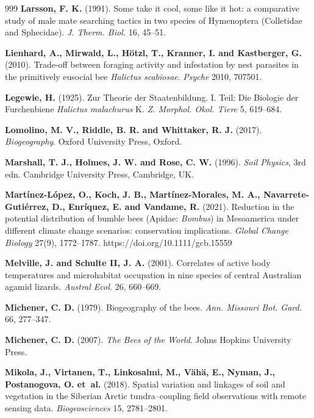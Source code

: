 \documentclass[11pt,a4paper]{article}
\begin{document}
\begin{thebibliography}{999}
\textbf{Larsson, F. K.} (1991).
Some take it cool, some like it hot: a comparative study of male mate searching tactics in two species of Hymenoptera (Colletidae and Sphecidae).
\textit{J. Therm. Biol.} 16, 45--51.

\textbf{Lienhard, A., Mirwald, L., H\"otzl, T., Kranner, I. and Kastberger, G.} (2010). Trade-off between foraging activity and infestation by nest parasites in the primitively eusocial bee \textit{Halictus scabiosae}. \textit{Psyche} 2010, 707501.

\textbf{Legewie, H.} (1925). Zur Theorie der Staatenbildung. I. Teil: Die Biologie der Furchenbiene \textit{Halictus malachurus} K. \textit{Z. Morphol. Okol. Tiere} 5, 619--684.

\textbf{Lomolino, M. V., Riddle, B. R. and Whittaker, R. J.} (2017).
\textit{Biogeography}. Oxford University Press, Oxford.

\textbf{Marshall, T. J., Holmes, J. W. and Rose, C. W.} (1996).
\textit{Soil Physics}, 3rd edn.
Cambridge University Press, Cambridge, UK.

\textbf{Martínez-López, O., Koch, J. B., Martínez-Morales, M. A., Navarrete-Gutiérrez, D., Enríquez, E. and Vandame, R.} (2021).
Reduction in the potential distribution of bumble bees (Apidae: \textit{Bombus}) in Mesoamerica under different climate change scenarios: conservation implications.
\textit{Global Change Biology} 27(9), 1772--1787. https://doi.org/10.1111/gcb.15559

\textbf{Melville, J. and Schulte II, J. A.} (2001). Correlates of active body temperatures and microhabitat occupation in nine species of central Australian agamid lizards. \textit{Austral Ecol.} 26, 660--669.

\textbf{Michener, C. D.} (1979). Biogeography of the bees. \textit{Ann. Missouri Bot. Gard.} 66, 277--347.

\textbf{Michener, C. D.} (2007).
\textit{The Bees of the World}.
Johns Hopkins University Press.

\textbf{Mikola, J., Virtanen, T., Linkosalmi, M., V{\"a}h{\"a}, E., Nyman, J., Postanogova, O. et~al.} (2018).
Spatial variation and linkages of soil and vegetation in the Siberian Arctic tundra--coupling field observations with remote sensing data.
\textit{Biogeosciences} 15, 2781--2801.


\end{thebibliography}
\end{document}
